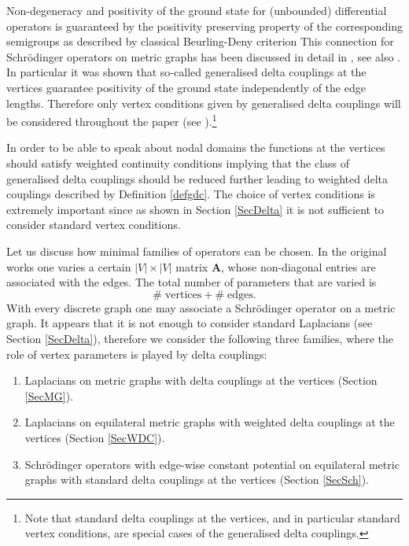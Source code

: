\documentclass{amsart}
\theoremstyle{definition}
\theoremstyle{remark}
\numberwithin{equation}{section}
\begin{document}
Non-degeneracy and positivity of the ground state for
(unbounded) differential operators is guaranteed by the
positivity preserving property of the corresponding semigroups as described by classical
Beurling-Deny criterion \cite{BeDe,ReSi4}
This connection for Schr\"odinger operators on metric graphs
has been discussed in detail  in \cite{Ku19}, see also \cite[Section 4.5]{PK24}.
In particular it was shown that so-called generalised delta couplings at
the vertices guarantee positivity of the ground state independently of
the edge lengths. Therefore only vertex conditions given by generalised 
delta couplings will be considered throughout the paper (see \cite[Section 3.7]{PK24}).\footnote{Note that 
standard delta couplings at the vertices, and in particular standard vertex conditions, are special cases of 
the generalised delta couplings.}

In order to be able to speak about nodal domains the functions
at the vertices should satisfy weighted continuity conditions implying that
the class of generalised delta couplings should be reduced further
leading to weighted delta couplings described by Definition \ref{defgdc}.
The choice of vertex conditions is extremely important since as shown in Section \ref{SecDelta}
it is not sufficient to consider standard vertex conditions.

Let us discuss how minimal families of operators can be chosen.
 In the original works one varies a certain $ |V| \times |V| $ matrix $ \mathbf A$, whose non-diagonal entries 
are associated with the edges. 
The total number of parameters that are varied is 
\begin{equation} \label{parameters}
\# \; \mbox{vertices} + \# \; \mbox{edges}.
\end{equation}
With every discrete graph one may associate a Schr\"odinger operator on a metric graph. It appears that it is not enough to
consider standard Laplacians (see Section \ref{SecDelta}), therefore we consider the following three families, where the role
of vertex parameters is played by delta couplings:
\begin{enumerate}
\item Laplacians on metric graphs with delta couplings at the vertices (Section \ref{SecMG}).

\item Laplacians on equilateral metric graphs with weighted delta couplings at the vertices (Section \ref{SecWDC}).

\item Schr\"odinger operators with edge-wise constant potential
 on equilateral metric graphs with standard delta couplings at the vertices (Section \ref{SecSch}).
\end{enumerate}
\end{document}
